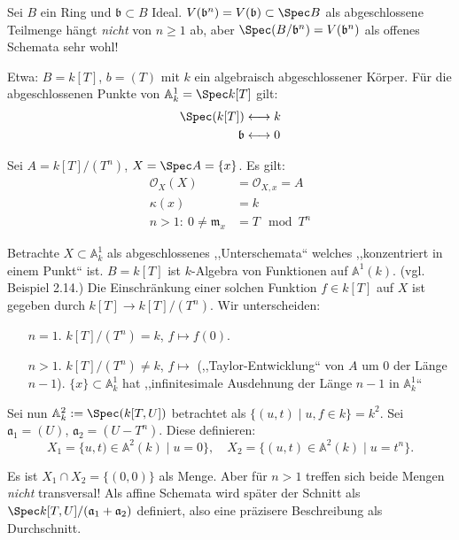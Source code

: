 \begin{example}[39]
  Sei $B$ ein Ring und $\mathfrak{b}\subset B$ Ideal. $V(\mathfrak{b}^{n})=V(\mathfrak{b})\subset\Spec B$
  als abgeschlossene Teilmenge hängt \emph{nicht }von $n\geq1$ ab,
  aber $\Spec(B/\mathfrak{b}^{n})=V(\mathfrak{b}^{n})$ als offenes
  Schemata sehr wohl!

  Etwa: $B=k[T]$, $b=(T)$ mit $k$ ein algebraisch abgeschlossener
  Körper. Für die abgeschlossenen Punkte von $\mathbb{A}_{k}^{1}=\Spec k[T]$
  gilt:
  \begin{align*}
    \Spec(k[T]) & \longleftrightarrow k\\
    \mathfrak{b} & \longleftrightarrow0
  \end{align*}

  Sei $A=k[T]/(T^{n})$, $X=\Spec A=\{x\}$. Es gilt: 
  \begin{align*}
    \mathcal{O}_{X}(X) & =\mathcal{O}_{X,x}=A\\
    \kappa(x) & =k\\
    n>1:\ 0\neq\mathfrak{m}_{x} & =T\mod T^{n}
  \end{align*}

  Betrachte $X\subset\mathbb{A}_{k}^{1}$ als abgeschlossenes ,,Unterschemata``
  welches ,,konzentriert in einem Punkt`` ist. $B=k[T]$ ist $k$-Algebra
  von Funktionen auf $\mathbb{A}^{1}(k)$. (vgl. Beispiel 2.14.) Die
  Einschränkung einer solchen Funktion $f\in k[T]$ auf $X$ ist gegeben
  durch $k[T]\rightarrow k[T]/(T^{n})$. Wir unterscheiden:
  \begin{itemize}
  \item[$n=1$.] $k[T]/(T^{n})=k$, $f\mapsto f(0)$.
  \item[$n>1$.] $k[T]/(T^{n})\neq k$, $f\mapsto$ (,,Taylor-Entwicklung`` von
    $A$ um 0 der Länge $n-1$). $\{x\}\subset\mathbb{A}_{k}^{1}$ hat
    ,,infinitesimale Ausdehnung der Länge $n-1$ in $\mathbb{A}_{k}^{1}$``
  \end{itemize}
  Sei nun $\mathbb{A}_{k}^{2}:=\Spec(k[T,U])$ betrachtet als $\{(u,t)\mid u,f\in k\}=k^{2}$.
  Sei $\mathfrak{a}_{1}=(U)$, $\mathfrak{a}_{2}=(U-T^{n})$. Diese
  definieren:
  \[
    X_{1}=\{u,t)\in\mathbb{A}^{2}(k)\mid u=0\},\quad X_{2}=\{(u,t)\in\mathbb{A}^{2}(k)\mid u=t^{n}\}.
  \]

  Es ist $X_{1}\cap X_{2}=\{(0,0)\}$ als Menge. Aber für $n>1$ treffen
  sich beide Mengen \emph{nicht} transversal! Als affine Schemata wird
  später der Schnitt als $\Spec k[T,U]/(\mathfrak{a}_{1}+\mathfrak{a}_{2})$
  definiert, also eine präzisere Beschreibung als Durchschnitt.
\end{example}
